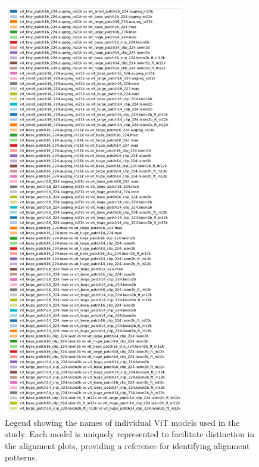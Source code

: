 \documentclass[10pt,a4paper]{article}
\begin{document}
\begin{figure}[H]
    \centering
    \includegraphics[width=0.7\textwidth]{legend_models.png}
    \caption{Legend showing the names of individual ViT models used in the study. Each model is uniquely represented to facilitate distinction in the alignment plots, providing a reference for identifying alignment patterns.}
    \label{fig:legend_models}
\end{figure}
\end{document}
